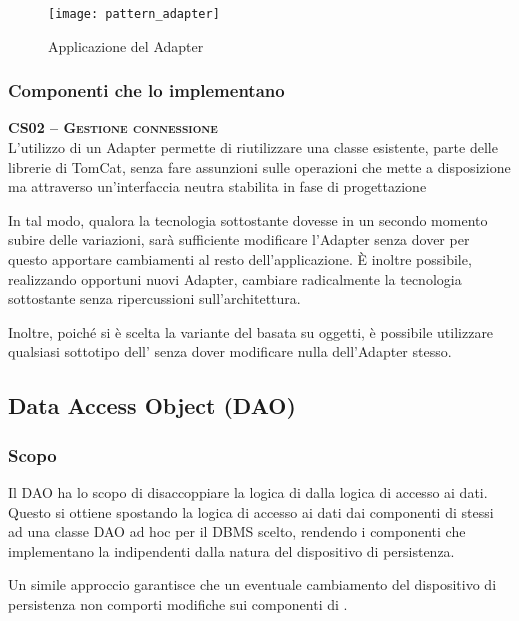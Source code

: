 \begin{figure}[H]
  \centering
  \texttt{[image: pattern\_adapter]}
  \caption{Applicazione del  Adapter}\label{fig:adapter}
\end{figure}

\subsubsection{Componenti che lo implementano}
\begin{description}
\item{\scshape\bfseries CS02 -- Gestione connessione}\\
L'utilizzo di un Adapter permette di riutilizzare una classe esistente, parte delle librerie di TomCat, senza fare assunzioni sulle operazioni che mette a disposizione ma attraverso un'interfaccia neutra stabilita in fase di progettazione

In tal modo, qualora la tecnologia sottostante dovesse in un secondo momento subire delle variazioni, sarà sufficiente modificare l'Adapter senza dover per questo apportare cambiamenti al resto dell'applicazione. È inoltre possibile, realizzando opportuni nuovi Adapter, cambiare radicalmente la tecnologia sottostante senza ripercussioni sull'architettura.

Inoltre, poiché si è scelta la variante del  basata su oggetti, è possibile utilizzare qualsiasi sottotipo dell' senza dover modificare nulla dell'Adapter stesso.
\end{description}

\subsection{Data Access Object (DAO)}

\subsubsection{Scopo}
Il  DAO ha lo scopo di disaccoppiare la logica di  dalla logica di accesso ai dati. Questo si ottiene spostando la logica di accesso ai dati dai componenti di  stessi ad una classe DAO ad hoc per il DBMS scelto, rendendo i componenti che implementano la  indipendenti dalla natura del dispositivo di persistenza.

Un simile approccio garantisce che un eventuale cambiamento del dispositivo di persistenza non comporti modifiche sui componenti di .

